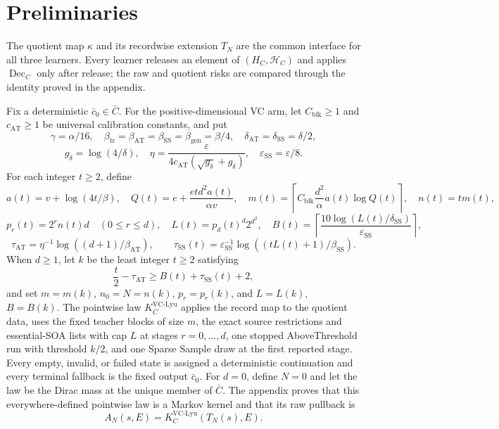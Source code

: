 \section{Preliminaries}

The quotient map $\kappa$ and its recordwise extension $T_N$ are the common
interface for all three learners.  Every learner releases an element of
$(H_C,\mathcal H_C)$ and applies $\operatorname{Dec}_C$ only after release;
the raw and quotient risks are compared through the identity proved in the
appendix.

Fix a deterministic $\bar c_0\in\bar C$.  For the positive-dimensional VC
arm, let $C_{\mathrm{blk}}\ge1$ and $c_{\mathrm{AT}}\ge1$ be universal
calibration constants, and put
\[
\gamma=\alpha/16,\quad
\beta_{\mathrm{tr}}=\beta_{\mathrm{AT}}=\beta_{\mathrm{SS}}
 =\beta_{\mathrm{gen}}=\beta/4,\quad
\delta_{\mathrm{AT}}=\delta_{\mathrm{SS}}=\delta/2,
\]
\[
g_\delta=\log(4/\delta),\quad
\eta=\frac{\varepsilon}{4c_{\mathrm{AT}}(\sqrt{g_\delta}+g_\delta)},
\quad \varepsilon_{\mathrm{SS}}=\varepsilon/8.
\]
For each integer $t\ge2$, define
\[
a(t)=v+\log(4t/\beta),\quad
Q(t)=e+\frac{etd^2a(t)}{\alpha v},\quad
m(t)=\left\lceil C_{\mathrm{blk}}\frac{d^2}{\alpha}a(t)\log Q(t)\right\rceil,
\quad n(t)=tm(t),
\]
\[
p_r(t)=2^rn(t)d\quad(0\le r\le d),\quad
L(t)=p_d(t)^d2^{d^2},\quad
B(t)=\left\lceil\frac{10\log(L(t)/\delta_{\mathrm{SS}})}{\varepsilon_{\mathrm{SS}}}\right\rceil,
\]
\[
\tau_{\mathrm{AT}}=\eta^{-1}\log((d+1)/\beta_{\mathrm{AT}}),\qquad
\tau_{\mathrm{SS}}(t)=\varepsilon_{\mathrm{SS}}^{-1}
 \log((tL(t)+1)/\beta_{\mathrm{SS}}).
\]
When $d\ge1$, let $k$ be the least integer $t\ge2$ satisfying
\[
\frac{t}{2}-\tau_{\mathrm{AT}}\ge B(t)+\tau_{\mathrm{SS}}(t)+2,
\]
and set $m=m(k)$, $n_0=N=n(k)$, $p_r=p_r(k)$, and $L=L(k)$,
$B=B(k)$.  The pointwise law $K_C^{\mathrm{VC\text{-}Lyu}}$ applies the
record map to the quotient data, uses the fixed teacher blocks of size $m$,
the exact source restrictions and essential-SOA lists with cap $L$ at stages
$r=0,\ldots,d$, one stopped AboveThreshold run with threshold $k/2$, and
one Sparse Sample draw at the first reported stage.  Every empty, invalid,
or failed state is assigned a deterministic continuation and every terminal
fallback is the fixed output $\bar c_0$.  For $d=0$, define $N=0$ and let the
law be the Dirac mass at the unique member of $\bar C$.  The appendix proves
that this everywhere-defined pointwise law is a Markov kernel and that its
raw pullback is
\[
A_N(s,E)=K_C^{\mathrm{VC\text{-}Lyu}}(T_N(s),E).
\]

